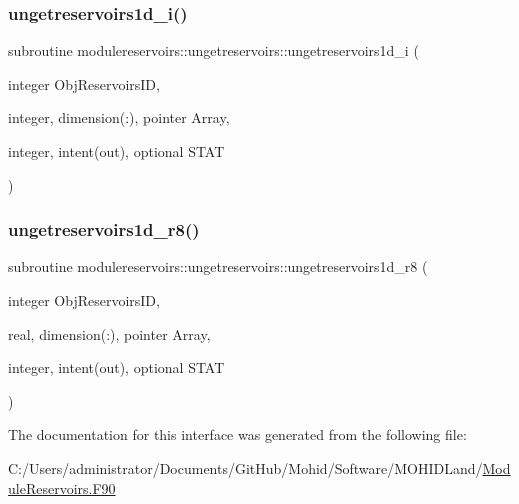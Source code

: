 \subsubsection{\texorpdfstring{ungetreservoirs1d\+\_\+i()}{ungetreservoirs1d\_i()}}
{\footnotesize\ttfamily subroutine modulereservoirs\+::ungetreservoirs\+::ungetreservoirs1d\+\_\+i (\begin{DoxyParamCaption}\item[{integer}]{Obj\+Reservoirs\+ID,  }\item[{integer, dimension(\+:), pointer}]{Array,  }\item[{integer, intent(out), optional}]{S\+T\+AT }\end{DoxyParamCaption})\hspace{0.3cm}{\ttfamily [private]}}

\mbox{\label{interfacemodulereservoirs_1_1ungetreservoirs_a569d835370d6fe8ac249694c84dc5a12}} 
\subsubsection{\texorpdfstring{ungetreservoirs1d\+\_\+r8()}{ungetreservoirs1d\_r8()}}
{\footnotesize\ttfamily subroutine modulereservoirs\+::ungetreservoirs\+::ungetreservoirs1d\+\_\+r8 (\begin{DoxyParamCaption}\item[{integer}]{Obj\+Reservoirs\+ID,  }\item[{real, dimension(\+:), pointer}]{Array,  }\item[{integer, intent(out), optional}]{S\+T\+AT }\end{DoxyParamCaption})\hspace{0.3cm}{\ttfamily [private]}}



The documentation for this interface was generated from the following file\+:\begin{DoxyCompactItemize}
\item 
C\+:/\+Users/administrator/\+Documents/\+Git\+Hub/\+Mohid/\+Software/\+M\+O\+H\+I\+D\+Land/\mbox{\hyperlink{_module_reservoirs_8_f90}{Module\+Reservoirs.\+F90}}\end{DoxyCompactItemize}

